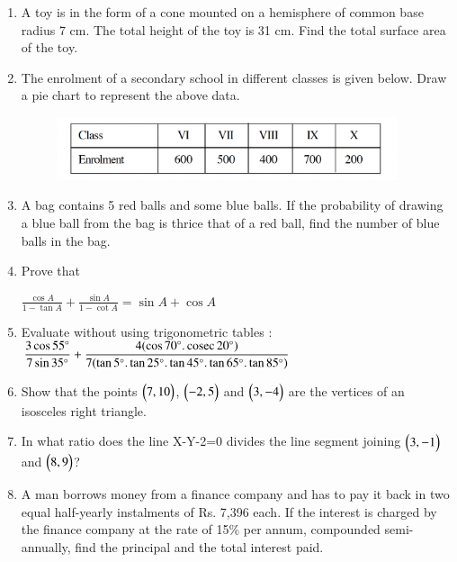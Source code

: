 \documentclass[journal,12pt,twocolumn]{IEEEtran}
\begin{document}
\begin{enumerate}
 \medskip
 \item A toy is in the form of a cone mounted on a hemisphere of common base radius 7 cm. The total height of the toy is 31 cm. Find the total surface area of the toy.
 \medskip
 \item The enrolment of a secondary school in different classes is given below. Draw a pie chart to represent the above data.
 \begin{figure}[h!]
    \centering
    \includegraphics[width=10cm]{7.png}
 \end{figure}
 \medskip
 \item A bag contains 5 red balls and some blue balls. If the probability of drawing a blue ball from the bag is thrice that of a red ball, find the number of blue balls in the bag.
 \medskip
 \item Prove that
 \begin{center}
 $\displaystyle\frac{\cos A}{1-\tan A}+\displaystyle\frac{\sin A}{1-\cot A}=\sin A+\cos A$
 \end{center}
 \medskip
 \item Evaluate without using trigonometric tables :\\
 \bigskip
 $\displaystyle\frac{3\cos55\degree}{7\sin35\degree}+\displaystyle\frac{4(\cos70\degree.\,\text{cosec}\,20\degree)}{7(\tan5\degree.\tan25\degree.\tan45\degree.\tan65\degree.\tan85\degree)}$
 \medskip
 \item Show that the points $\begin{pmatrix}7,10\end{pmatrix} $, $\begin{pmatrix}-2,5\end{pmatrix} $ and $\begin{pmatrix}3,-4\end{pmatrix} $ are the vertices of an isosceles right triangle.
 \medskip
 \item In what ratio does the line X-Y-2=0 divides the line segment joining  $\begin{pmatrix}3,-1\end{pmatrix} $ and  $\begin{pmatrix}8,9\end{pmatrix} $? 
 \medskip
 \item A man borrows money from a finance company and has to pay it back in two equal half-yearly instalments of Rs. 7,396 each. If the interest is charged by the finance company at the rate of 15\%  per annum, compounded semi-annually, find the principal and the total interest paid.
 \bigskip

\end{enumerate}
\end{document}
